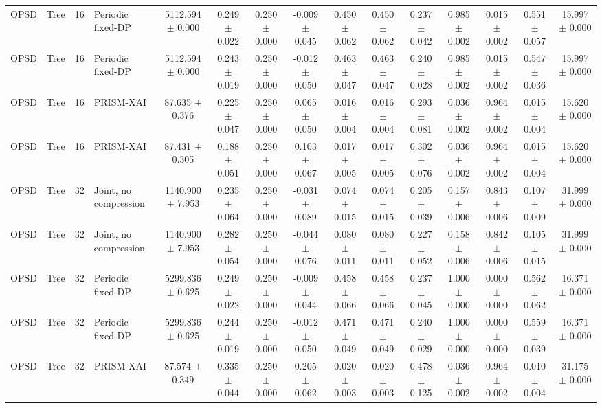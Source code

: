 \begin{tabular}{llllccccccccccc}
OPSD & Tree & 16 & Periodic fixed-DP & 5112.594 $\pm$ 0.000 & 0.249 $\pm$ 0.022 & 0.250 $\pm$ 0.000 & -0.009 $\pm$ 0.045 & 0.450 $\pm$ 0.062 & 0.450 $\pm$ 0.062 & 0.237 $\pm$ 0.042 & 0.985 $\pm$ 0.002 & 0.015 $\pm$ 0.002 & 0.551 $\pm$ 0.057 & 15.997 $\pm$ 0.000 \\
OPSD & Tree & 16 & Periodic fixed-DP & 5112.594 $\pm$ 0.000 & 0.243 $\pm$ 0.019 & 0.250 $\pm$ 0.000 & -0.012 $\pm$ 0.050 & 0.463 $\pm$ 0.047 & 0.463 $\pm$ 0.047 & 0.240 $\pm$ 0.028 & 0.985 $\pm$ 0.002 & 0.015 $\pm$ 0.002 & 0.547 $\pm$ 0.036 & 15.997 $\pm$ 0.000 \\
OPSD & Tree & 16 & PRISM-XAI & 87.635 $\pm$ 0.376 & 0.225 $\pm$ 0.047 & 0.250 $\pm$ 0.000 & 0.065 $\pm$ 0.050 & 0.016 $\pm$ 0.004 & 0.016 $\pm$ 0.004 & 0.293 $\pm$ 0.081 & 0.036 $\pm$ 0.002 & 0.964 $\pm$ 0.002 & 0.015 $\pm$ 0.004 & 15.620 $\pm$ 0.000 \\
OPSD & Tree & 16 & PRISM-XAI & 87.431 $\pm$ 0.305 & 0.188 $\pm$ 0.051 & 0.250 $\pm$ 0.000 & 0.103 $\pm$ 0.067 & 0.017 $\pm$ 0.005 & 0.017 $\pm$ 0.005 & 0.302 $\pm$ 0.076 & 0.036 $\pm$ 0.002 & 0.964 $\pm$ 0.002 & 0.015 $\pm$ 0.004 & 15.620 $\pm$ 0.000 \\
OPSD & Tree & 32 & Joint, no compression & 1140.900 $\pm$ 7.953 & 0.235 $\pm$ 0.064 & 0.250 $\pm$ 0.000 & -0.031 $\pm$ 0.089 & 0.074 $\pm$ 0.015 & 0.074 $\pm$ 0.015 & 0.205 $\pm$ 0.039 & 0.157 $\pm$ 0.006 & 0.843 $\pm$ 0.006 & 0.107 $\pm$ 0.009 & 31.999 $\pm$ 0.000 \\
OPSD & Tree & 32 & Joint, no compression & 1140.900 $\pm$ 7.953 & 0.282 $\pm$ 0.054 & 0.250 $\pm$ 0.000 & -0.044 $\pm$ 0.076 & 0.080 $\pm$ 0.011 & 0.080 $\pm$ 0.011 & 0.227 $\pm$ 0.052 & 0.158 $\pm$ 0.006 & 0.842 $\pm$ 0.006 & 0.105 $\pm$ 0.015 & 31.999 $\pm$ 0.000 \\
OPSD & Tree & 32 & Periodic fixed-DP & 5299.836 $\pm$ 0.625 & 0.249 $\pm$ 0.022 & 0.250 $\pm$ 0.000 & -0.009 $\pm$ 0.044 & 0.458 $\pm$ 0.066 & 0.458 $\pm$ 0.066 & 0.237 $\pm$ 0.045 & 1.000 $\pm$ 0.000 & 0.000 $\pm$ 0.000 & 0.562 $\pm$ 0.062 & 16.371 $\pm$ 0.000 \\
OPSD & Tree & 32 & Periodic fixed-DP & 5299.836 $\pm$ 0.625 & 0.244 $\pm$ 0.019 & 0.250 $\pm$ 0.000 & -0.012 $\pm$ 0.050 & 0.471 $\pm$ 0.049 & 0.471 $\pm$ 0.049 & 0.240 $\pm$ 0.029 & 1.000 $\pm$ 0.000 & 0.000 $\pm$ 0.000 & 0.559 $\pm$ 0.039 & 16.371 $\pm$ 0.000 \\
OPSD & Tree & 32 & PRISM-XAI & 87.574 $\pm$ 0.349 & 0.335 $\pm$ 0.044 & 0.250 $\pm$ 0.000 & 0.205 $\pm$ 0.062 & 0.020 $\pm$ 0.003 & 0.020 $\pm$ 0.003 & 0.478 $\pm$ 0.125 & 0.036 $\pm$ 0.002 & 0.964 $\pm$ 0.002 & 0.010 $\pm$ 0.004 & 31.175 $\pm$ 0.000 \\

\end{tabular}
